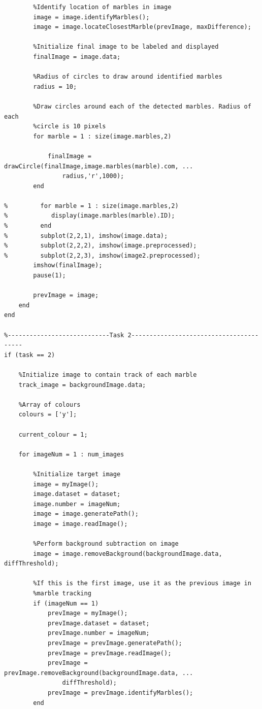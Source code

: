 \documentclass[10pt,a4paper,onecolumn]{report}
\begin{document}
\begin{lstlisting}
        %Identify location of marbles in image
        image = image.identifyMarbles();
        image = image.locateClosestMarble(prevImage, maxDifference);

        %Initialize final image to be labeled and displayed
        finalImage = image.data;

        %Radius of circles to draw around identified marbles
        radius = 10;

        %Draw circles around each of the detected marbles. Radius of each 
        %circle is 10 pixels
        for marble = 1 : size(image.marbles,2)
            
            finalImage = drawCircle(finalImage,image.marbles(marble).com, ...
                radius,'r',1000);
        end

%         for marble = 1 : size(image.marbles,2)
%            display(image.marbles(marble).ID);
%         end
%         subplot(2,2,1), imshow(image.data);
%         subplot(2,2,2), imshow(image.preprocessed);
%         subplot(2,2,3), imshow(image2.preprocessed);
        imshow(finalImage);
        pause(1);
        
        prevImage = image;
    end
end
    
%----------------------------Task 2----------------------------------------
if (task == 2)
    
    %Initialize image to contain track of each marble
    track_image = backgroundImage.data;
    
    %Array of colours
    colours = ['y'];
    
    current_colour = 1;
    
    for imageNum = 1 : num_images
        
        %Initialize target image
        image = myImage();
        image.dataset = dataset;
        image.number = imageNum;
        image = image.generatePath();
        image = image.readImage();

        %Perform background subtraction on image
        image = image.removeBackground(backgroundImage.data, diffThreshold);
        
        %If this is the first image, use it as the previous image in
        %marble tracking
        if (imageNum == 1)
            prevImage = myImage();
            prevImage.dataset = dataset;
            prevImage.number = imageNum;
            prevImage = prevImage.generatePath();
            prevImage = prevImage.readImage();
            prevImage = prevImage.removeBackground(backgroundImage.data, ...
                diffThreshold);
            prevImage = prevImage.identifyMarbles();
        end 
        

\end{lstlisting}
\end{document}
